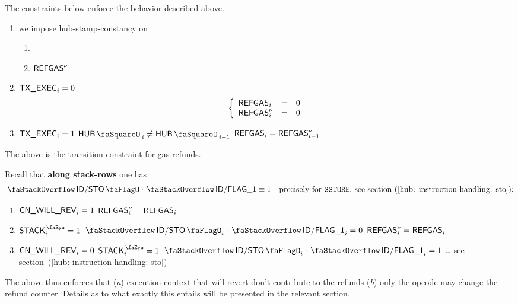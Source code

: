 The constraints below enforce the behavior described above.
\begin{enumerate}
        \item we impose hub-stamp-constancy on
		\begin{multicols}{2}
			\begin{enumerate}
				\item {}
				\item $\textsf{REFGAS}^{\nu}$
			\end{enumerate}
		\end{multicols}
	\item \If $\textsf{TX}\textsf{\_EXEC}_{i} = 0$ \Then
		\[
			\left\{ \begin{array}{lcl}
				\textsf{REFGAS}_{i}     & = & 0 \\
				\textsf{REFGAS}^{\nu}_{i} & = & 0 \\
			\end{array} \right.
		\]
	\item \If $\textsf{TX}\textsf{\_EXEC}_{i} = 1$ \et $\hubStamp_{i} \neq \hubStamp_{i - 1}$ \Then $\textsf{REFGAS}_{i} = \textsf{REFGAS}^{\nu}_{i - 1}$
\end{enumerate}
The above is the transition constraint for gas refunds.

Recall that \textbf{along stack-rows} one has
\[
		\stackDecStoFlag \cdot \decFlag{1} \equiv 1  \quad \text{precisely for \inst{SSTORE}, see section~(\ref{hub: instruction handling: sto});}
\]
\begin{enumerate}[resume]
	\item \If $\textsf{CN}\textsf{\_WILL\_REV}_{i} = 1$
		\Then $\textsf{REFGAS}^{\nu}_{i} = \textsf{REFGAS}_{i}$
	\item \If $\peekStack_{i} = 1$ \et $\stackDecStoFlag  _{i} \cdot \decFlag{1}_{i} = 0$
		\Then $\textsf{REFGAS}^{\nu}_{i} = \textsf{REFGAS}_{i}$
	\item \If $\textsf{CN}\textsf{\_WILL\_REV}_{i} = 0$ \et $\peekStack_{i} = 1$ \If $\stackDecStoFlag_{i} \cdot \decFlag{1}_{i}  = 1$ \Then \dots{} see section~(\ref{hub: instruction handling: sto})
\end{enumerate}
The above thus enforces that
(\emph{a}) execution context that will revert don't contribute to the refunds
(\emph{b}) only the  opcode may change the refund counter.
Details as to what exactly this entails will be presented in the relevant section.
